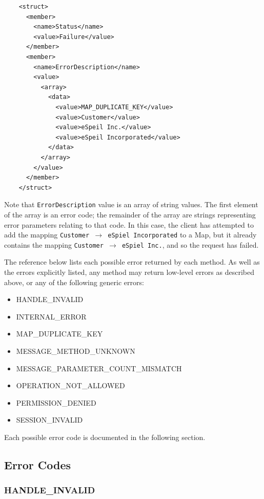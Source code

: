 \begin{verbatim}
    <struct>
      <member>
        <name>Status</name>
        <value>Failure</value>
      </member>
      <member>
        <name>ErrorDescription</name>
        <value>
          <array>
            <data>
              <value>MAP_DUPLICATE_KEY</value>
              <value>Customer</value>
              <value>eSpeil Inc.</value>
              <value>eSpeil Incorporated</value>
            </data>
          </array>
        </value>
      </member>
    </struct>
\end{verbatim}

Note that {\tt ErrorDescription} value is an array of string values. The
first element of the array is an error code; the remainder of the array are
strings representing error parameters relating to that code.  In this case,
the client has attempted to add the mapping {\tt Customer $\rightarrow$
eSpiel Incorporated} to a Map, but it already contains the mapping
{\tt Customer $\rightarrow$ eSpiel Inc.}, and so the request has failed.

The reference below lists each possible error returned by each method.
As well as the errors explicitly listed, any method may return low-level
errors as described above, or any of the following generic errors:

\begin{itemize}
\item HANDLE\_INVALID
\item INTERNAL\_ERROR
\item MAP\_DUPLICATE\_KEY
\item MESSAGE\_METHOD\_UNKNOWN
\item MESSAGE\_PARAMETER\_COUNT\_MISMATCH
\item OPERATION\_NOT\_ALLOWED
\item PERMISSION\_DENIED
\item SESSION\_INVALID
\end{itemize}

Each possible error code is documented in the following section.

\subsection{Error Codes}

\subsubsection{HANDLE\_INVALID}

